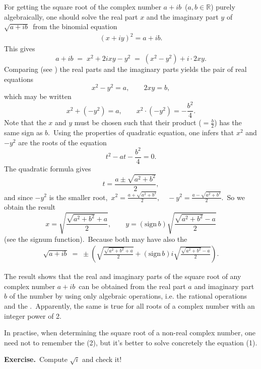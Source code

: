 \documentclass[12pt]{article}
\theoremstyle{definition}
\begin{document}
For getting the square root of the complex number\; $a\!+\!ib$\, 
($a, b\in \mathbb{R}$) purely algebraically, one should solve the real part $x$ and the imaginary part $y$ of\, $\sqrt{a\!+\!ib}$\, from the binomial equation
\begin{align}
  (x\!+\!iy)^2 = a\!+\!ib.
\end{align}
This gives 
$$a\!+\!ib \;=\; x^2\!+\!2ixy\!-\!y^2 \;=\; 
(x^2\!-\!y^2)\!+\!i\!\cdot\!2xy.$$
Comparing (see ) the real parts and the imaginary parts yields the pair of real equations
$$x^2\!-\!y^2 = a,\qquad 2xy = b,$$
which may be written
$$x^2\!+\!(-y^2) = a, \qquad x^2\!\cdot\!(-y^2) = -\frac{b^2}{4}.$$
Note that the  $x$ and $y$ must be chosen such that their product ($= \frac{b}{2}$) has the same sign as $b$.\, Using the properties of quadratic equation, one infers that $x^2$ and $-y^2$ are the roots of the equation 
$$t^2\!-\!at\!-\!\frac{b^2}{4} = 0.$$
The quadratic formula gives
$$t = \frac{a\pm\sqrt{a^2\!+\!b^2}}{2},$$
and since $-y^2$ is the smaller root,\, $x^2 = \frac{a\!+\!\sqrt{a^2\!+\!b^2}}{2},\quad
 -y^2 = \frac{a\!-\!\sqrt{a^2\!+\!b^2}}{2}$.\, So we obtain the result
$$x = \sqrt{\frac{\sqrt{a^2\!+\!b^2}+\!a}{2}}, \qquad
y = (\mathrm{sign}\,b)\sqrt{\frac{\sqrt{a^2\!+\!b^2}-\!a}{2}}$$
(see the signum function).\, Because both may have also the 
\begin{align}
\sqrt{a\!+\!ib} \;=\; 
\pm\left(\sqrt{\frac{\sqrt{a^2\!+\!b^2}+\!a}{2}}+(\mathrm{sign}\,{b})i\sqrt{\frac{\sqrt{a^2\!+\!b^2}-\!a}{2}}\right).
\end{align}

The result shows that the real and imaginary parts of the square root of any complex number\; $a\!+\!ib$\, can be obtained from the real part $a$ and imaginary part $b$ of the number by using only algebraic operations, i.e. the rational operations and the .\, Apparently, the same is true for all roots of a complex number with  an integer power of 2.

In practise, when determining the square root of a non-real complex number, one need not to remember the  (2), but it's better to solve concretely the equation (1).

\textbf{Exercise.}\, Compute $\sqrt{i}$ and check it!
\end{document}

